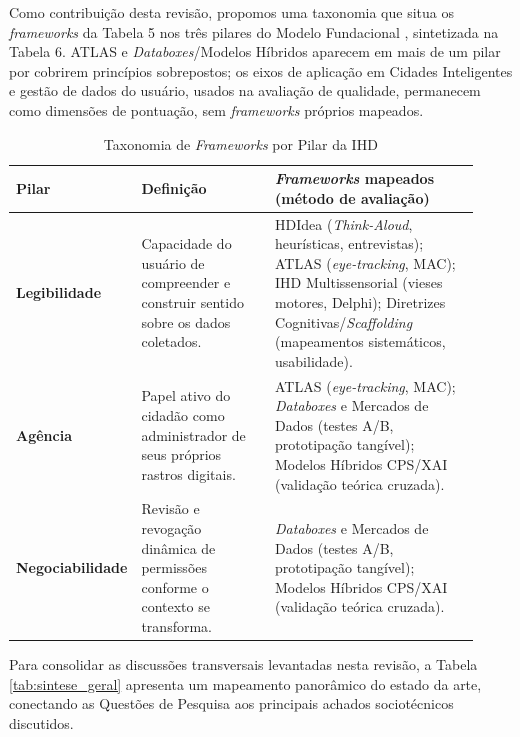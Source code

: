 \documentclass[12pt]{article}
\begin{document}
    Como contribuição desta revisão, propomos uma taxonomia que situa os \textit{frameworks} da Tabela 5 nos três pilares do Modelo Fundacional \cite{mortier2015humandatainteractionhumanface}, sintetizada na Tabela 6. ATLAS e \textit{Databoxes}/Modelos Híbridos aparecem em mais de um pilar por cobrirem princípios sobrepostos; os eixos de aplicação em Cidades Inteligentes e gestão de dados do usuário, usados na avaliação de qualidade, permanecem como dimensões de pontuação, sem \textit{frameworks} próprios mapeados.

\begin{table}[H]
\centering
\caption{Taxonomia de \textit{Frameworks} por Pilar da IHD}
\label{tab:taxonomia_ihd}
\scriptsize
\renewcommand{\arraystretch}{1.0}
\setlength{\tabcolsep}{3pt}
\begin{tabular}{
  >{\raggedright\arraybackslash}p{0.16\linewidth}
  >{\raggedright\arraybackslash}p{0.30\linewidth}
  >{\raggedright\arraybackslash}p{0.46\linewidth}
}
\toprule
\textbf{Pilar} & \textbf{Definição} & \textbf{\textit{Frameworks} mapeados (método de avaliação)} \\ \midrule
\textbf{Legibilidade} & Capacidade do usuário de compreender e construir sentido sobre os dados coletados. & HDIdea (\textit{Think-Aloud}, heurísticas, entrevistas); ATLAS (\textit{eye-tracking}, MAC); IHD Multissensorial (vieses motores, Delphi); Diretrizes Cognitivas/\textit{Scaffolding} (mapeamentos sistemáticos, usabilidade). \\
\textbf{Agência} & Papel ativo do cidadão como administrador de seus próprios rastros digitais. & ATLAS (\textit{eye-tracking}, MAC); \textit{Databoxes} e Mercados de Dados (testes A/B, prototipação tangível); Modelos Híbridos CPS/XAI (validação teórica cruzada). \\
\textbf{Negociabilidade} & Revisão e revogação dinâmica de permissões conforme o contexto se transforma. & \textit{Databoxes} e Mercados de Dados (testes A/B, prototipação tangível); Modelos Híbridos CPS/XAI (validação teórica cruzada). \\ \bottomrule
\end{tabular}
\end{table}

    Para consolidar as discussões transversais levantadas nesta revisão, a Tabela \ref{tab:sintese_geral} apresenta um mapeamento panorâmico do estado da arte, conectando as Questões de Pesquisa aos principais achados sociotécnicos discutidos.
\end{document}
